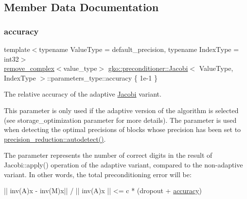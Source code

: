 \subsection{Member Data Documentation}
\mbox{\label{structgko_1_1preconditioner_1_1Jacobi_1_1parameters__type_ad4fd0de7ce4d390584e947afb6d0ce73}} 
\subsubsection{\texorpdfstring{accuracy}{accuracy}}
{\footnotesize\ttfamily template$<$typename Value\+Type  = default\+\_\+precision, typename Index\+Type  = int32$>$ \\
\hyperlink{namespacegko_adfcb75c44f6b6c701989419c166f6e7e}{remove\+\_\+complex}$<$value\+\_\+type$>$ \hyperlink{classgko_1_1preconditioner_1_1Jacobi}{gko\+::preconditioner\+::\+Jacobi}$<$ Value\+Type, Index\+Type $>$\+::parameters\+\_\+type\+::accuracy \{ 1e-\/1 \}\hspace{0.3cm}{\ttfamily [mutable]}}



The relative accuracy of the adaptive \hyperlink{classgko_1_1preconditioner_1_1Jacobi}{Jacobi} variant. 

This parameter is only used if the adaptive version of the algorithm is selected (see storage\+\_\+optimization parameter for more details). The parameter is used when detecting the optimal precisions of blocks whose precision has been set to \hyperlink{classgko_1_1precision__reduction_ac4109c61fadb24db7a1888c51ac483e9}{precision\+\_\+reduction\+::autodetect()}.

The parameter represents the number of correct digits in the result of Jacobi\+::apply() operation of the adaptive variant, compared to the non-\/adaptive variant. In other words, the total preconditioning error will be\+:


\begin{DoxyCode}
|| inv(A)x - inv(M)x|| / || inv(A)x || <= c * (dropout + \hyperlink{structgko_1_1preconditioner_1_1Jacobi_1_1parameters__type_ad4fd0de7ce4d390584e947afb6d0ce73}{accuracy})
\end{DoxyCode}



